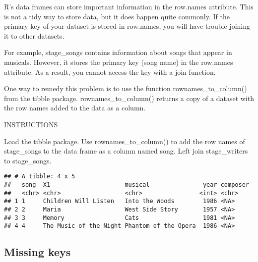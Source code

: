 \documentclass[]{article}
\newenvironment{Shaded}{\begin{snugshade}}{\end{snugshade}}
\newcommand{\KeywordTok}[1]{\textcolor[rgb]{0.13,0.29,0.53}{\textbf{#1}}}
\newcommand{\DataTypeTok}[1]{\textcolor[rgb]{0.13,0.29,0.53}{#1}}
\newcommand{\StringTok}[1]{\textcolor[rgb]{0.31,0.60,0.02}{#1}}
\newcommand{\CommentTok}[1]{\textcolor[rgb]{0.56,0.35,0.01}{\textit{#1}}}
\newcommand{\OperatorTok}[1]{\textcolor[rgb]{0.81,0.36,0.00}{\textbf{#1}}}
\newcommand{\NormalTok}[1]{#1}
\begin{document}
R's data frames can store important information in the row.names
attribute. This is not a tidy way to store data, but it does happen
quite commonly. If the primary key of your dataset is stored in
row.names, you will have trouble joining it to other datasets.

For example, stage\_songs contains information about songs that appear
in musicals. However, it stores the primary key (song name) in the
row.names attribute. As a result, you cannot access the key with a join
function.

One way to remedy this problem is to use the function
rownames\_to\_column() from the tibble package. rownames\_to\_column()
returns a copy of a dataset with the row names added to the data as a
column.

INSTRUCTIONS

Load the tibble package. Use rownames\_to\_column() to add the row names
of stage\_songs to the data frame as a column named song. Left join
stage\_writers to stage\_songs.

\begin{Shaded}
\end{Shaded}

\begin{verbatim}
## # A tibble: 4 x 5
##   song  X1                     musical               year composer
##   <chr> <chr>                  <chr>                <int> <chr>   
## 1 1     Children Will Listen   Into the Woods        1986 <NA>    
## 2 2     Maria                  West Side Story       1957 <NA>    
## 3 3     Memory                 Cats                  1981 <NA>    
## 4 4     The Music of the Night Phantom of the Opera  1986 <NA>
\end{verbatim}

\subsection{Missing keys}\label{missing-keys}
\end{document}
